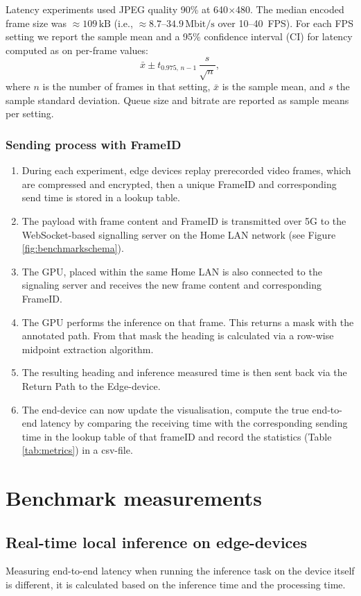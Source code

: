 \documentclass{ieeeaccess}
\begin{document}
Latency experiments used JPEG quality 90\% at 640\(\times\)480. The median encoded frame size was \(\approx 109\,\mathrm{kB}\) (i.e., \(\approx 8.7\)–\(34.9\,\mathrm{Mbit/s}\) over 10–40~FPS). For each FPS setting we report the sample mean and a 95\% confidence interval (CI) for latency computed as on per-frame values:
\[
\bar{x} \pm t_{0.975,\,n-1}\,\frac{s}{\sqrt{n}},
\]
where \(n\) is the number of frames in that setting, \(\bar{x}\) is the sample mean, and \(s\) the sample standard deviation. Queue size and bitrate are reported as sample means per setting.


\subsubsection*{Sending process with FrameID}
\begin{enumerate}
    \item During each experiment, edge devices replay prerecorded video frames, which are compressed and encrypted, then a unique FrameID and corresponding send time is stored in a lookup table.
    \item The payload with frame content and FrameID is transmitted over 5G to the WebSocket-based signalling server on the Home LAN network (see Figure \ref{fig:benchmarkschema}).
    \item The GPU, placed within the same Home LAN is also connected to the signaling server and receives the new frame content and corresponding FrameID.
    \item The GPU performs the inference on that frame. This returns a mask with the annotated path. From that mask the heading is calculated via a row-wise midpoint extraction algorithm. 
    \item The resulting heading and inference measured time is then sent back via the Return Path to the Edge-device. 
    \item The end-device can now update the visualisation, compute the true end-to-end latency by comparing the receiving time with the corresponding sending time in the lookup table of that frameID and record the statistics (Table \ref{tab:metrics}) in a csv-file.  
    
\end{enumerate}

\section{Benchmark measurements}
\subsection{Real-time local inference on edge-devices}
\label{sec:inferencingedge}
Measuring end-to-end latency when running the inference task on the device itself is different, it is calculated based on the inference time and the processing time.
\end{document}
